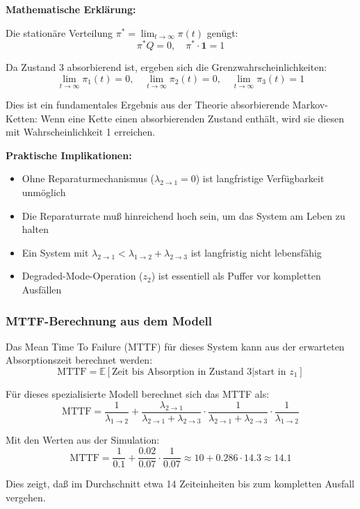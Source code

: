 \documentclass[a4paper,11pt]{article}
\theoremstyle{definition}
\begin{document}
\textbf{Mathematische Erklärung:}

Die stationäre Verteilung $\pi^* = \lim_{t \to \infty} \pi(t)$ genügt:
\[
    \pi^* Q = 0, \quad \pi^* \cdot \mathbf{1} = 1
\]

Da Zustand 3 absorbierend ist, ergeben sich die Grenzwahrscheinlichkeiten:
\[
    \lim_{t \to \infty} \pi_1(t) = 0, \quad \lim_{t \to \infty} \pi_2(t) = 0, 
    \quad \lim_{t \to \infty} \pi_3(t) = 1
\]

Dies ist ein fundamentales Ergebnis aus der Theorie absorbierende Markov-Ketten: 
Wenn eine Kette einen absorbierenden Zustand enthält, wird sie diesen mit Wahrscheinlichkeit 1 
erreichen.

\textbf{Praktische Implikationen:}
\begin{itemize}
    \item Ohne Reparaturmechanismus ($\lambda_{2 \to 1} = 0$) ist langfristige Verfügbarkeit 
          unmöglich
    \item Die Reparaturrate muß hinreichend hoch sein, um das System am Leben zu halten
    \item Ein System mit $\lambda_{2 \to 1} < \lambda_{1 \to 2} + \lambda_{2 \to 3}$ ist 
          langfristig nicht lebensfähig
    \item Degraded-Mode-Operation ($z_2$) ist essentiell als Puffer vor kompletten Ausfällen
\end{itemize}

\subsubsection{MTTF-Berechnung aus dem Modell}

Das Mean Time To Failure (MTTF) für dieses System kann aus der erwarteten Absorptionszeit 
berechnet werden:
\[
    \text{MTTF} = \mathbb{E}[\text{Zeit bis Absorption in Zustand 3} | \text{start in } z_1]
\]

Für dieses spezialisierte Modell berechnet sich das MTTF als:
\[
    \text{MTTF} = \frac{1}{\lambda_{1 \to 2}} + \frac{\lambda_{2 \to 1}}{\lambda_{2 \to 1} + \lambda_{2 \to 3}} 
                  \cdot \frac{1}{\lambda_{2 \to 1} + \lambda_{2 \to 3}} \cdot \frac{1}{\lambda_{1 \to 2}}
\]

Mit den Werten aus der Simulation:
\[
    \text{MTTF} = \frac{1}{0.1} + \frac{0.02}{0.07} \cdot \frac{1}{0.07} \approx 10 + 0.286 \cdot 14.3 \approx 14.1
\]

Dies zeigt, daß im Durchschnitt etwa 14 Zeiteinheiten bis zum kompletten Ausfall vergehen.
\end{document}
